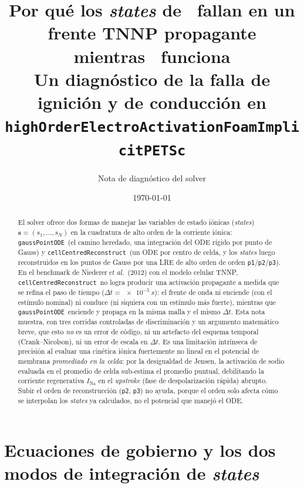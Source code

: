 \documentclass[11pt,a4paper]{article}
\title{Por qué los \emph{states} de \ccrec\ fallan en un frente TNNP propagante\\
       mientras \gpode\ funciona\\[2pt]
       \large Un diagnóstico de la falla de ignición y de conducción en
       \texttt{highOrderElectroActivationFoamImplicitPETSc}}
\author{Nota de diagnóstico del solver}
\date{\today}
\newcommand{\code}[1]{\texttt{\small #1}}
\newcommand{\gpode}{\code{gaussPointODE}}
\newcommand{\ccrec}{\code{cellCentredReconstruct}}
\newcommand{\states}{\mathbf{s}}
\begin{document}
\maketitle

\begin{abstract}
El solver ofrece dos formas de manejar las variables de estado iónicas
(\emph{states}) $\states=(s_1,\dots,s_{N})$ en la cuadratura de alto orden de la
corriente iónica: \gpode\ (el camino heredado, una integración del ODE rígido por
punto de Gauss) y \ccrec\ (un ODE por centro de celda, y los \emph{states} luego
reconstruidos en los puntos de Gauss por una LRE de alto orden de orden
\code{p1}/\code{p2}/\code{p3}). En el benchmark de
Niederer\,\emph{et al.}~(2012) con el modelo celular TNNP, \ccrec\ no logra
producir una activación propagante a medida que se refina el paso de tiempo
($\Delta t=\SI{e-5}{s}$): el frente de onda ni enciende (con el estímulo nominal)
ni conduce (ni siquiera con un estímulo más fuerte), mientras que \gpode\ enciende
y propaga en la misma malla y el mismo $\Delta t$. Esta nota muestra, con tres
corridas controladas de discriminación y un argumento matemático breve, que esto
\emph{no} es un error de código, ni un artefacto del esquema temporal
(Crank--Nicolson), ni un error de escala en $\Delta t$. Es una limitación
intrínseca de precisión al evaluar una cinética iónica fuertemente no lineal en el
potencial de membrana \emph{promediado en la celda}: por la desigualdad de Jensen,
la activación de sodio evaluada en el promedio de celda sub-estima el promedio
puntual, debilitando la corriente regenerativa $I_{\mathrm{Na}}$ en el
\emph{upstroke} (fase de despolarización rápida) abrupto. Subir el orden de
reconstrucción (\code{p2}, \code{p3}) no ayuda, porque el orden solo afecta cómo
se interpolan los \emph{states} ya calculados, no el potencial que manejó el ODE.
\end{abstract}

\section{Ecuaciones de gobierno y los dos modos de integración de \emph{states}}
\end{document}
